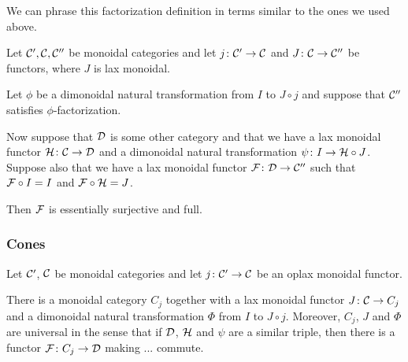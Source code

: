 \documentclass{article}
\begin{document}
We can phrase this factorization definition in terms similar to the ones we used above.

\begin{proposition}
  Let ${\mathcal{C}}',{\mathcal{C}},{\mathcal{C}}''$ be monoidal categories and let $j\colon {\mathcal{C}}'\to {\mathcal{C}}$ and $J\colon {\mathcal{C}}\to {\mathcal{C}}''$ be functors, where $J$ is lax monoidal.  

  Let $\phi$ be a dimonoidal natural transformation from $I$ to $J\circ j$ and suppose that ${\mathcal{C}}''$ satisfies $\phi$-factorization.

  Now suppose that ${\mathcal{D}}$ is some other category and that we have a lax monoidal functor $\mathcal H\colon {\mathcal{C}} \to {\mathcal{D}}$ and a dimonoidal natural transformation $\psi\colon I \to \mathcal H\circ J$.  
  Suppose also that we have a lax monoidal functor $\mathcal F\colon {\mathcal{D}}\to{\mathcal{C}}''$ such that $\mathcal F\circ I = I$ and $\mathcal F\circ\mathcal H=J$.

  Then $\mathcal F$ is essentially surjective and full.
\end{proposition}

\subsubsection{Cones}

Let ${\mathcal{C}}'$, ${\mathcal{C}}$ be monoidal categories and let $j\colon {\mathcal{C}}'\to {\mathcal{C}}$ be an oplax monoidal functor.  

\begin{proposition}
  \label{prop:cone}
  There is a monoidal category $C_j$ together with a lax monoidal functor $J\colon{\mathcal{C}} \to C_j$ and a dimonoidal natural transformation $\Phi$ from $I$ to $J\circ j$.  
  Moreover, $C_j$, $J$ and $\Phi$ are universal in the sense that if ${\mathcal{D}}$, $\mathcal H$ and $\psi$ are a similar triple, then there is a functor $\mathcal F\colon C_j\to {\mathcal{D}}$ making ... commute.
\end{proposition}
\end{document}
